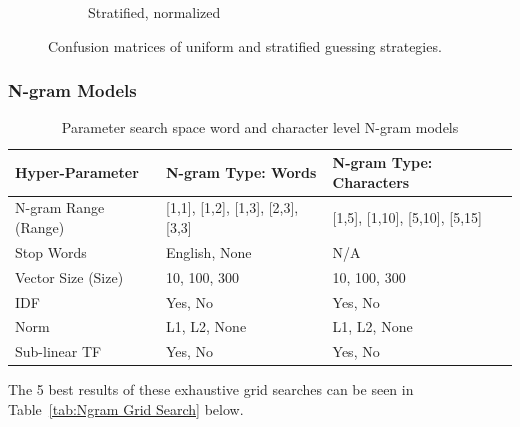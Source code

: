\begin{figure}[h]
\begin{subfigure}[b]{0.48\textwidth}
        \caption{Stratified, normalized}
\label{fig:guessing-stratified-normalized}
    \end{subfigure}
    \caption{Confusion matrices of uniform and stratified guessing strategies. }
\label{fig:guessing-conf-matrix}
\end{figure}

\subsubsection{N-gram Models}


\begin{table}[h]
  \begin{center}
  \begin{tabular}{ l l l}
    \toprule
    Hyper-Parameter & N-gram Type: Words & N-gram Type: Characters \\
    \midrule
    N-gram Range (Range) & [1,1], [1,2], [1,3], [2,3], [3,3] & [1,5], [1,10], [5,10], [5,15] \\
    Stop Words & English, None & N/A \\
    Vector Size (Size) & 10, 100, 300 & 10, 100, 300 \\
    IDF & Yes, No & Yes, No \\
    Norm & L1, L2, None & L1, L2, None \\
    Sub-linear TF & Yes, No & Yes, No \\
    \bottomrule
  \end{tabular}
  \caption{Parameter search space word and character level N-gram models}
\label{tab:Ngram Parameters}
\end{center}
\end{table}

The 5 best results of these exhaustive grid searches can be seen in Table~\ref{tab:Ngram Grid Search} below.

